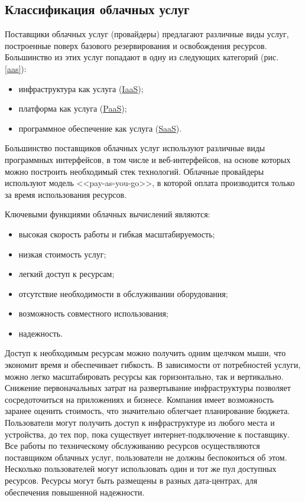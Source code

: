 \subsection{Классификация облачных услуг}

Поставщики облачных услуг (провайдеры) предлагают различные виды услуг, построенные поверх базового резервирования и освобождения ресурсов.
Большинство из этих услуг попадают в одну из следующих категорий (рис. \ref{aas}):
\begin{itemize}
  \item инфраструктура как услуга (\hyperlink{iaas}{IaaS});
  \item платформа как услуга (\hyperlink{paas}{PaaS});
  \item программное обеспечение как услуга (\hyperlink{saas}{SaaS}).
\end{itemize}


Большинство поставщиков облачных услуг используют различные виды программных интерфейсов, в том числе и веб-интерфейсов, на основе которых можно построить необходимый стек технологий.
Облачные провайдеры используют модель <<pay-as-you-go>>, в которой оплата производится только за время использования ресурсов.

Ключевыми функциями облачных вычислений являются:
\begin{itemize}
  \item высокая скорость работы и гибкая масштабируемость;
  \item низкая стоимость услуг;
  \item легкий доступ к ресурсам;
  \item отсутствие необходимости в обслуживании оборудования;
  \item возможность совместного использования;
  \item надежность.
\end{itemize}

Доступ к необходимым ресурсам можно получить одним щелчком мыши, что экономит время и обеспечивает гибкость.
В зависимости от потребностей услуги, можно легко масштабировать ресурсы как горизонтально, так и вертикально.
Снижение первоначальных затрат на развертывание инфраструктуры позволяет сосредоточиться на приложениях и бизнесе.
Компания имеет возможность заранее оценить стоимость, что значительно облегчает планирование бюджета.
Пользователи могут получить доступ к инфраструктуре из любого места и устройства, до тех пор, пока существует интернет-подключение к поставщику.
Все работы по техническому обслуживанию ресурсов осуществляются поставщиком облачных услуг, пользователи не должны беспокоиться об этом.
Несколько пользователей могут использовать один и тот же пул доступных ресурсов.
Ресурсы могут быть размещены в разных дата-центрах, для обеспечения повышенной надежности.

